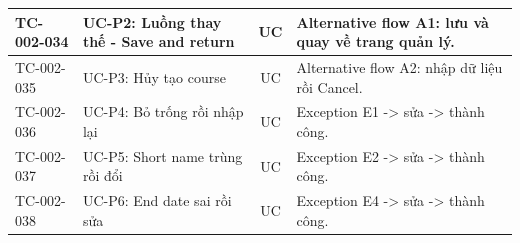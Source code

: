 {\begin{longtable}{|l|L{4.4cm}|c|L{6.4cm}|}
TC-002-034 & UC-P2: Luồng thay thế - Save and return & UC & Alternative flow A1: lưu và quay về trang quản lý. \\ \hline
TC-002-035 & UC-P3: Hủy tạo course & UC & Alternative flow A2: nhập dữ liệu rồi Cancel. \\ \hline
TC-002-036 & UC-P4: Bỏ trống rồi nhập lại & UC & Exception E1 -\textgreater{} sửa -\textgreater{} thành công. \\ \hline
TC-002-037 & UC-P5: Short name trùng rồi đổi & UC & Exception E2 -\textgreater{} sửa -\textgreater{} thành công. \\ \hline
TC-002-038 & UC-P6: End date sai rồi sửa & UC & Exception E4 -\textgreater{} sửa -\textgreater{} thành công. \\ \hline
\end{longtable}
}
